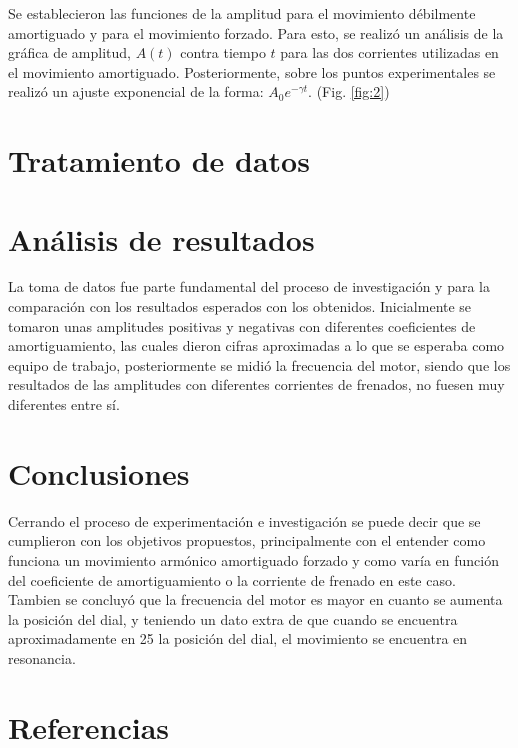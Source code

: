 \documentclass[spanish,notitlepage,letterpaper, 12pt]{article}
\begin{document}
Se establecieron las funciones de la amplitud para el movimiento
débilmente amortiguado y para el movimiento forzado. Para esto, se realizó un análisis
de la gráfica de amplitud, $A(t)$ contra tiempo $t$ para las dos
corrientes utilizadas en el movimiento amortiguado. Posteriormente, sobre los puntos
experimentales se realizó un ajuste exponencial de la forma: $A_0e^{-\gamma t}$. (Fig. \ref{fig:2})
\section{Tratamiento de datos} \label{TD}
\section{Análisis de resultados}
La toma de datos fue parte fundamental del proceso de investigación y para la comparación con los resultados esperados con los obtenidos. Inicialmente se tomaron unas amplitudes positivas y negativas con diferentes coeficientes de amortiguamiento, las cuales dieron cifras aproximadas a lo que se
esperaba como equipo de trabajo, posteriormente se midió la frecuencia del motor, siendo que los resultados de las amplitudes con diferentes corrientes de frenados, no fuesen muy diferentes entre sí.
\section{Conclusiones}
Cerrando el proceso de experimentación e investigación se puede decir que se cumplieron con los objetivos propuestos, principalmente con el entender como funciona un movimiento armónico amortiguado forzado y como varía en función del coeficiente de amortiguamiento o la corriente de frenado en este caso. Tambien se concluyó que la frecuencia del motor es mayor en cuanto se aumenta la posición del dial, y teniendo un dato extra de que cuando se encuentra aproximadamente en 25 la posición del dial, el movimiento se encuentra en resonancia.
\section{Referencias} 


\end{document}
